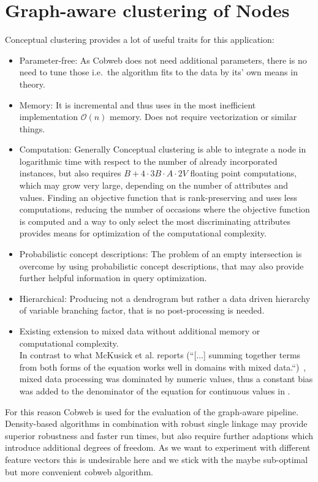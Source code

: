 \section{Graph-aware clustering of Nodes}\label{\positionnumber}
Conceptual clustering provides a lot of useful traits for this application: 
\begin{itemize}
    \item Parameter-free: As Cobweb does not need additional parameters, there is no need to tune those i.e.~the algorithm fits to the data by its' own means in theory.
    \item Memory: It is incremental and thus uses in the most inefficient implementation $\mathcal{O}(n)$ memory. Does not require vectorization or similar things.
    \item Computation: Generally Conceptual clustering is able to integrate a node in logarithmic time with respect to the number of already incorporated instances, but also requires  $B + 4 \cdot 3B \cdot A \cdot 2V$ floating point computations, which may grow very large, depending on the number of attributes and values. Finding an objective function that is rank-preserving and uses less computations, reducing the number of occasions where the objective function is computed and a way to only select the most discriminating attributes provides means for optimization of the computational complexity.
    \item Probabilistic concept descriptions: The problem of an empty intersection is overcome by using probabilistic concept descriptions, that may also provide further helpful information in query optimization.
    \item Hierarchical: Producing not a dendrogram but rather a data driven hierarchy of variable branching factor, that is no post-processing is needed.
    \item Existing extension to mixed data without additional memory or computational complexity. \\ 
    In contrast to what McKusick et al. reports (``[...] summing together terms from both forms of the equation works well in domains with mixed data.``)~\cite{mckusick1990cobweb}, mixed data processing was dominated by numeric values, thus a constant bias was added to the denominator of the equation for continuous values in .
\end{itemize}
For this reason Cobweb is used for the evaluation of the graph-aware pipeline. Density-based algorithms in combination with robust single linkage may provide superior robustness and faster run times, but also require further adaptions which introduce additional degrees of freedom. As we want to experiment with different feature vectors this is undesirable here and we stick with the maybe sub-optimal but more convenient cobweb algorithm. \\

